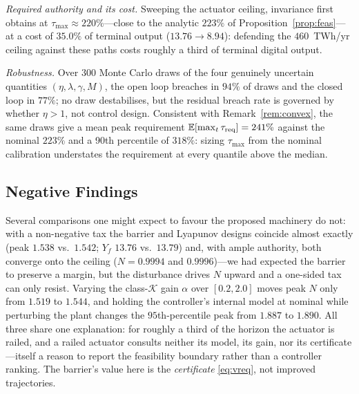\documentclass[conference,letterpaper,10pt]{IEEEtran}
\theoremstyle{plain}
\theoremstyle{remark}
\begin{document}
\emph{Required authority and its cost.} Sweeping the actuator ceiling,
invariance first obtains at $\tau_{\max}\approx220\%$---close to the
analytic $223\%$ of Proposition~\ref{prop:feas}---at a cost of $35.0\%$
of terminal output ($13.76\to8.94$): defending the $460$~TWh/yr
ceiling against these paths costs roughly a third of terminal digital
output.

\emph{Robustness.} Over $300$ Monte Carlo draws of the four genuinely
uncertain quantities $(\eta,\lambda,\gamma,M)$, the open loop breaches
in $94\%$ of draws and the closed loop in $77\%$; no draw destabilises,
but the residual breach rate is governed by whether $\eta>1$, not
control design. Consistent with Remark~\ref{rem:convex}, the same
draws give a mean peak requirement
$\mathbb{E}[\max_t\tau_{\rm req}]=241\%$ against the nominal $223\%$
and a 90th percentile of $318\%$: sizing $\tau_{\max}$ from the nominal
calibration understates the requirement at every quantile above the
median.

\subsection{Negative Findings}
\label{sec:neg}
Several comparisons one might expect to favour the proposed machinery
do not: with a non-negative tax the barrier and Lyapunov designs
coincide almost exactly (peak $1.538$ vs.\ $1.542$; $Y_f$ $13.76$
vs.\ $13.79$) and, with ample authority, both converge onto the ceiling
($N=0.9994$ and $0.9996$)---we had expected the barrier to preserve a
margin, but the disturbance drives $N$ upward and a one-sided tax can
only resist. Varying the class-$\mathcal{K}$ gain $\alpha$ over
$[0.2,2.0]$ moves peak $N$ only from $1.519$ to $1.544$, and holding
the controller's internal model at nominal while perturbing the plant
changes the $95$th-percentile peak from $1.887$ to $1.890$. All three
share one explanation: for roughly a third of the horizon the actuator
is railed, and a railed actuator consults neither its model, its gain,
nor its certificate---itself a reason to report the feasibility
boundary rather than a controller ranking. The barrier's value here is
the \emph{certificate} \eqref{eq:vreq}, not improved trajectories.
\end{document}
